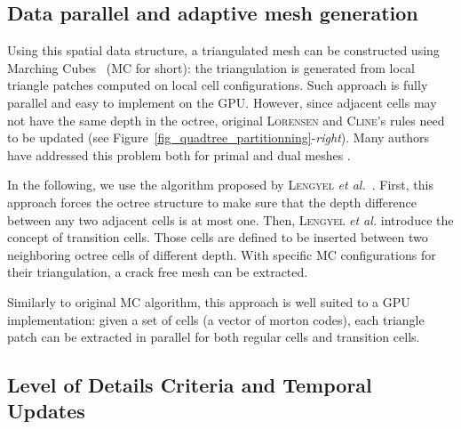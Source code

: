 \documentclass{llncs}
\begin{document}
\subsection{Data parallel and adaptive mesh generation}

Using this spatial data structure, a triangulated mesh can be constructed
using Marching Cubes~\cite{lorensen1987marching} (MC for short): the
triangulation is generated from local triangle patches computed on
local cell configurations.
Such approach is fully parallel and easy to implement on the GPU\@.
However, since adjacent cells may not have the same depth
in the octree, original \textsc{Lorensen} and \textsc{Cline}'s rules need to be
updated (see Figure~\ref{fig_quadtree_partitionning}-\emph{right}).
Many authors have addressed this problem both for primal and
dual meshes
\cite{shu1995adaptive,schaefer2004dual,lengyel2010voxel,DBLP:journals/cgf/LewinerMPPL10,DBLP:journals/cvgip/LobelloDD14}.

In the following, we use the
algorithm
proposed by \textsc{Lengyel} \emph{et al.}~\cite{lengyel2010voxel}.
First, this approach forces the octree
structure
to make sure that the depth difference between any
two adjacent cells is at most one.
Then, \textsc{Lengyel} \emph{et al.} introduce the concept of transition cells.
Those cells are defined to be inserted between two neighboring octree cells of different depth.
With specific MC configurations for their triangulation, a crack free mesh can
be extracted.

Similarly to original MC algorithm, this approach is well suited %
to a GPU implementation: given a set of cells (a vector of morton codes),
each triangle patch can be extracted in parallel for both regular cells and transition cells.

\subsection{Level of Details Criteria and Temporal Updates}
\end{document}

